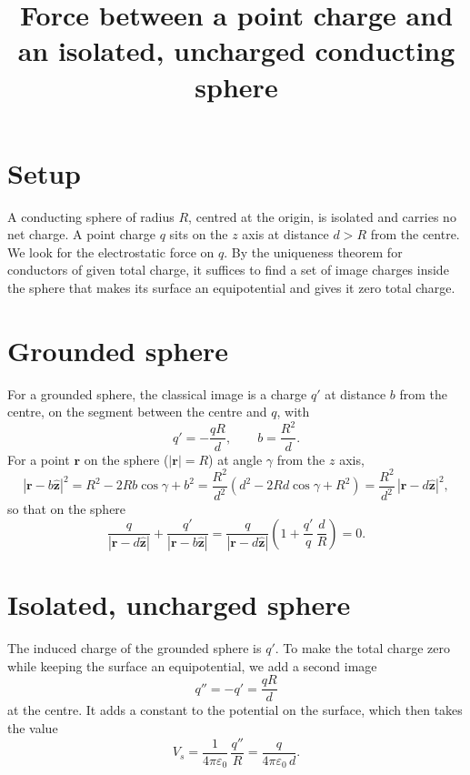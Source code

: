 \documentclass{article}
\title{Force between a point charge and an isolated, uncharged conducting sphere}
\date{}
\begin{document}
\maketitle

\section{Setup}
A conducting sphere of radius $R$, centred at the origin, is isolated and carries no net charge. A point charge $q$ sits on the $z$ axis at distance $d > R$ from the centre. We look for the electrostatic force on $q$. By the uniqueness theorem for conductors of given total charge, it suffices to find a set of image charges inside the sphere that makes its surface an equipotential and gives it zero total charge.

\section{Grounded sphere}
For a grounded sphere, the classical image is a charge $q'$ at distance $b$ from the centre, on the segment between the centre and $q$, with
\begin{equation}
  q' = -\frac{qR}{d}, \qquad b = \frac{R^2}{d} .
  \label{eq:image}
\end{equation}
For a point $\mathbf r$ on the sphere ($|\mathbf r| = R$) at angle $\gamma$ from the $z$ axis,
\begin{equation}
  |\mathbf r - b\hat{\mathbf z}|^2 = R^2 - 2Rb\cos\gamma + b^2 = \frac{R^2}{d^2}\left(d^2 - 2Rd\cos\gamma + R^2\right) = \frac{R^2}{d^2}\,|\mathbf r - d\hat{\mathbf z}|^2 ,
  \label{eq:distances}
\end{equation}
so that on the sphere
\begin{equation}
  \frac{q}{|\mathbf r - d\hat{\mathbf z}|} + \frac{q'}{|\mathbf r - b\hat{\mathbf z}|} = \frac{q}{|\mathbf r - d\hat{\mathbf z}|}\left(1 + \frac{q'}{q}\,\frac{d}{R}\right) = 0 .
  \label{eq:zero}
\end{equation}

\section{Isolated, uncharged sphere}
The induced charge of the grounded sphere is $q'$. To make the total charge zero while keeping the surface an equipotential, we add a second image
\begin{equation}
  q'' = -q' = \frac{qR}{d}
  \label{eq:second}
\end{equation}
at the centre. It adds a constant to the potential on the surface, which then takes the value
\begin{equation}
  V_s = \frac{1}{4\pi\varepsilon_0}\,\frac{q''}{R} = \frac{q}{4\pi\varepsilon_0\, d} .
  \label{eq:Vs}
\end{equation}
\end{document}
